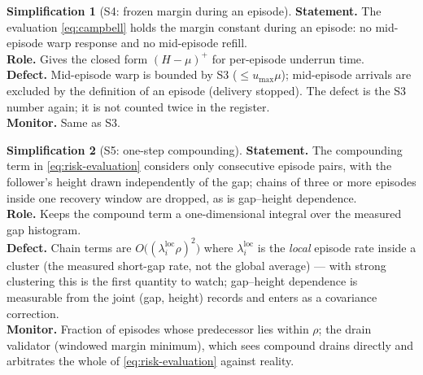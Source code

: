 \documentclass[11pt, a4paper]{article}
\theoremstyle{definition}
\newtheorem{simplification}{Simplification}
\theoremstyle{plain}
\theoremstyle{remark}
\newcommand{\pos}[1]{\left(#1\right)^{\!+}}
\begin{document}
\begin{simplification}[S4: frozen margin during an episode]
\label{simp:frozen}
\textbf{Statement.}  The evaluation \cref{eq:campbell} holds the margin
constant during an episode: no mid-episode warp response and no
mid-episode refill.\\
\textbf{Role.}  Gives the closed form $\pos{H-\mu}$ for per-episode
underrun time.\\
\textbf{Defect.}  Mid-episode warp is bounded by S3
($\le u_{\max}\mu$); mid-episode arrivals are excluded by the
definition of an episode (delivery stopped).  The defect is the S3
number again; it is not counted twice in the register.\\
\textbf{Monitor.}  Same as S3.
\end{simplification}

\begin{simplification}[S5: one-step compounding]
\label{simp:compound}
\textbf{Statement.}  The compounding term in \cref{eq:risk-evaluation}
considers only consecutive episode pairs, with the follower's height
drawn independently of the gap; chains of three or more episodes inside
one recovery window are dropped, as is gap--height dependence.\\
\textbf{Role.}  Keeps the compound term a one-dimensional integral over
the measured gap histogram.\\
\textbf{Defect.}  Chain terms are
$O\bigl((\lambda_i^{\mathrm{loc}}\rho)^2\bigr)$ where
$\lambda_i^{\mathrm{loc}}$ is the \emph{local} episode rate inside a
cluster (the measured short-gap rate, not the global average) ---
with strong clustering this is the first quantity to watch; gap--height
dependence is measurable from the joint (gap, height) records and enters
as a covariance correction.\\
\textbf{Monitor.}  Fraction of episodes whose predecessor lies within
$\rho$; the drain validator (windowed margin minimum), which sees
compound drains directly and arbitrates the whole of
\cref{eq:risk-evaluation} against reality.
\end{simplification}
\end{document}
